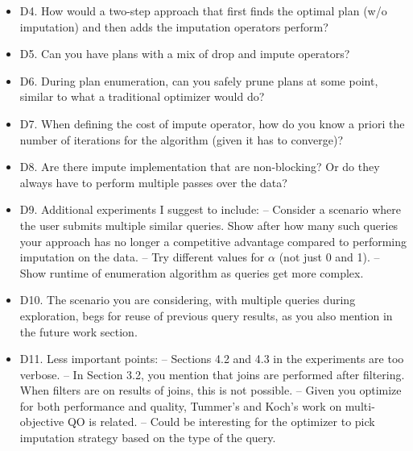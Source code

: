 \documentclass[draft,12pt]{article}
\begin{document}
\begin{itemize}
\item D4. How would a two-step approach that first finds the optimal plan (w/o imputation) and then adds the imputation operators perform?

\item D5. Can you have plans with a mix of drop and impute operators?

\item D6. During plan enumeration, can you safely prune plans at some point, similar to what a traditional optimizer would do?

\item D7. When defining the cost of impute operator, how do you know a priori the number of iterations for the algorithm (given it has to converge)?

\item D8. Are there impute implementation that are non-blocking? Or do they always have to perform multiple passes over the data?

\item D9. Additional experiments I suggest to include:
-- Consider a scenario where the user submits multiple similar queries. Show after how many such queries your approach has no longer a competitive advantage compared to performing imputation on the data.
-- Try different values for $\alpha$ (not just 0 and 1).
-- Show runtime of enumeration algorithm as queries get more complex.

\item D10. The scenario you are considering, with multiple queries during exploration, begs for reuse of previous query results, as you also mention in the future work section.

\item D11. Less important points:
-- Sections 4.2 and 4.3 in the experiments are too verbose.
-- In Section 3.2, you mention that joins are performed after filtering. When filters are on results of joins, this is not possible.
-- Given you optimize for both performance and quality, Tummer's and Koch's work on multi-objective QO is related.
-- Could be interesting for the optimizer to pick imputation strategy based on the type of the query.
\end{itemize}
\end{document}
